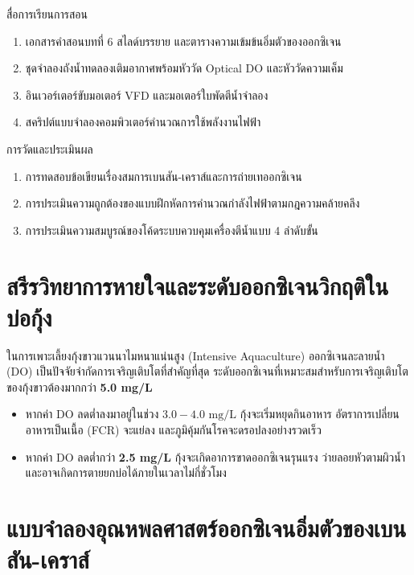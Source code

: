 \begin{planbox}{สื่อการเรียนการสอน}
\begin{enumerate}[topsep=2pt, itemsep=1pt, partopsep=0pt, parsep=0pt, leftmargin=1.5em]
    \item เอกสารคำสอนบทที่ 6 สไลด์บรรยาย และตารางความเข้มข้นอิ่มตัวของออกซิเจน
    \item ชุดจำลองถังน้ำทดลองเติมอากาศพร้อมหัววัด Optical DO และหัววัดความเค็ม
    \item อินเวอร์เตอร์ขับมอเตอร์ VFD และมอเตอร์ใบพัดตีน้ำจำลอง
    \item สคริปต์แบบจำลองคอมพิวเตอร์คำนวณการใช้พลังงานไฟฟ้า
\end{enumerate}
\end{planbox}

\begin{planbox}{การวัดและประเมินผล}
\begin{enumerate}[topsep=2pt, itemsep=1pt, partopsep=0pt, parsep=0pt, leftmargin=1.5em]
    \item การทดสอบข้อเขียนเรื่องสมการเบนสัน-เคราส์และการถ่ายเทออกซิเจน
    \item การประเมินความถูกต้องของแบบฝึกหัดการคำนวณกำลังไฟฟ้าตามกฎความคล้ายคลึง
    \item การประเมินความสมบูรณ์ของโค้ดระบบควบคุมเครื่องตีน้ำแบบ 4 ลำดับขั้น
\end{enumerate}
\end{planbox}

\clearpage

\section{สรีรวิทยาการหายใจและระดับออกซิเจนวิกฤติในบ่อกุ้ง}

ในการเพาะเลี้ยงกุ้งขาวแวนนาไมหนาแน่นสูง (Intensive Aquaculture) ออกซิเจนละลายน้ำ (DO) เป็นปัจจัยจำกัดการเจริญเติบโตที่สำคัญที่สุด ระดับออกซิเจนที่เหมาะสมสำหรับการเจริญเติบโตของกุ้งขาวต้องมากกว่า \textbf{5.0 mg/L} 
\begin{itemize}[leftmargin=1.5em]
    \item หากค่า DO ลดต่ำลงมาอยู่ในช่วง $3.0 - 4.0\text{ mg/L}$ กุ้งจะเริ่มหยุดกินอาหาร อัตราการเปลี่ยนอาหารเป็นเนื้อ (FCR) จะแย่ลง และภูมิคุ้มกันโรคจะดรอปลงอย่างรวดเร็ว
    \item หากค่า DO ลดต่ำกว่า \textbf{2.5 mg/L} กุ้งจะเกิดอาการขาดออกซิเจนรุนแรง ว่ายลอยหัวตามผิวน้ำ และอาจเกิดการตายยกบ่อได้ภายในเวลาไม่กี่ชั่วโมง
\end{itemize}

\section{แบบจำลองอุณหพลศาสตร์ออกซิเจนอิ่มตัวของเบนสัน-เคราส์}

